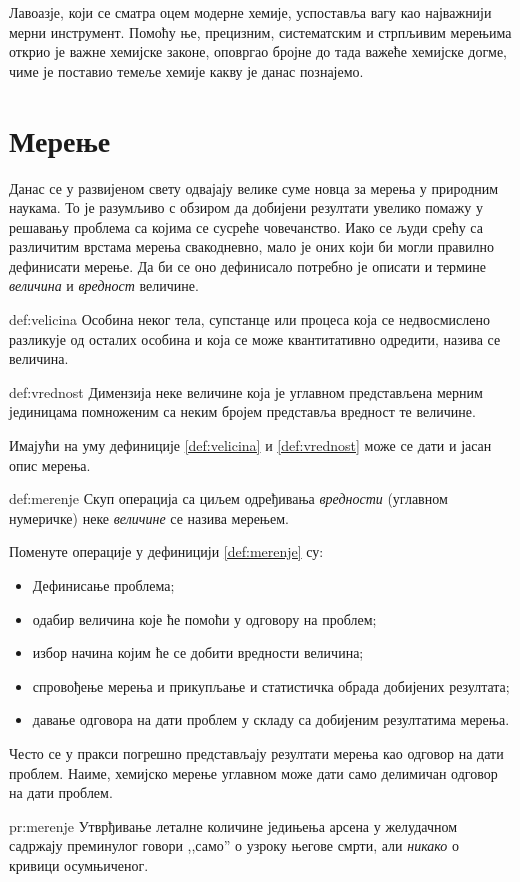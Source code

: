 Лавоазје, који се сматра оцем модерне хемије, успоставља вагу као
најважнији мерни инструмент. Помоћу ње, прецизним, систематским и
стрпљивим мерењима открио је важне хемијске законе, оповргао бројне
до тада важеће хемијске догме, чиме је поставио темеље хемије какву
је данас познајемо. 


\section{Мерење}

Данас се у развијеном свету одвајају велике суме новца за мерења
у природним наукама. То је разумљиво с обзиром да добијени резултати
увелико помажу у решавању проблема са којима се сусреће човечанство.
Иако се људи срећу са различитим врстама мерења свакодневно, мало
је оних који би могли правилно дефинисати мерење. Да би се оно
дефинисало потребно је описати и термине \emph{величина} и
\emph{вредност} величине.

\begin{df}[Величина]{def:velicina}
  Особина неког тела, супстанце или процеса која се недвосмислено
  разликује од осталих особина и која се може квантитативно одредити,
  назива се величина.
\end{df}

\begin{df}[Вредност]{def:vrednost}
  Димензија неке величине која је углавном представљена мерним јединицама
  помноженим са неким бројем представља вредност те величине.
\end{df}

Имајући на уму дефиниције \ref{def:velicina} и \ref{def:vrednost} може
се дати и јасан опис мерења.

\begin{df}[Мерење]{def:merenje}
  Скуп операција са циљем одређивања \emph{вредности} (углавном
  нумеричке) неке \emph{величине} се назива мерењем.
\end{df}
Поменуте операције у дефиницији \ref{def:merenje} су:
\begin{itemize}[label={$\RHD$}]
\item Дефинисање проблема;
\item одабир величина које ће помоћи у одговору на проблем;
\item избор начина којим ће се добити вредности величина;
\item спровођење мерења и прикупљање и статистичка обрада
добијених резултата;
\item давање одговора на дати проблем у складу са добијеним
резултатима мерења.
\end{itemize}

Често се у пракси погрешно представљају резултати мерења као одговор
на дати проблем. Наиме, хемијско мерење углавном може дати само делимичан
одговор на дати проблем.
\begin{pr}[]{pr:merenje}
  Утврђивање леталне количине једињења арсена у желудачном садржају
  преминулог говори ,,само'' о узроку његове смрти, али \emph{никако}
  о кривици осумњиченог.
\end{pr}

\nocite{*}



